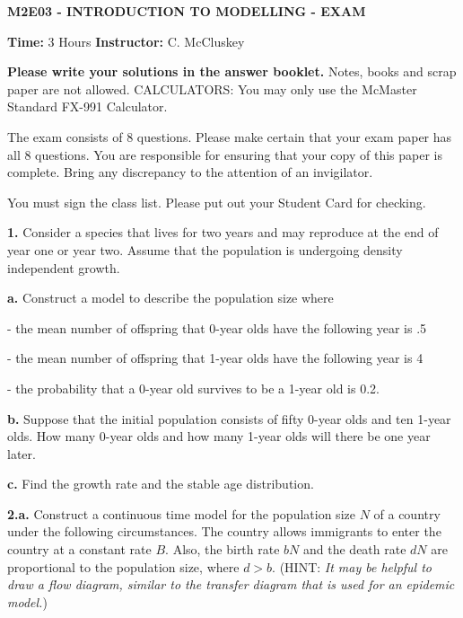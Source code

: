 \documentclass[reqno,12pt]{amsart}
\begin{document}
\begin{center}
{\bf M2E03 - INTRODUCTION TO MODELLING - EXAM}
\end{center}

\vspace{.5cm}
\noindent
{\bf Time:} \hspace{.5cm} 3 Hours
\hspace{7cm}
{\bf Instructor:} \hspace{.5cm} C. McCluskey


\vspace{.5cm}
\noindent
{\bf Please write your solutions in the answer booklet.}
Notes, books and scrap paper are not allowed.
CALCULATORS:  You may only use the McMaster Standard FX-991 Calculator.

\vspace{.5cm}
\noindent
The exam consists of 8 questions.  Please make certain that your exam
paper has all 8 questions.  You are responsible for ensuring that your
copy of this paper is complete.  Bring any discrepancy to the attention
of an invigilator.

\vspace{.5cm}
\noindent
You must sign the class list.
Please put out your Student Card for checking.




\vspace{2cm}


\noindent
{\bf 1.}  Consider a species that lives for two years and may reproduce
at the end of year one or year two.  Assume that the population is
undergoing density independent growth.

\noindent
{\bf a.} Construct a model to describe the population size where

- the mean number of offspring that 0-year olds have the following
year is .5 

- the mean number of offspring that 1-year olds have the following
year is 4

- the probability that a 0-year old survives to be a 1-year old
is 0.2.

\noindent
{\bf b.}  Suppose that the initial population consists of fifty 0-year
olds and ten 1-year olds.  How many 0-year olds and how many
1-year olds will there be one year later.

\noindent
{\bf c.}  Find the growth rate and the stable age distribution.

\vspace{3cm}

\noindent
{\bf 2.a.}  Construct a continuous time model for the population size
$N$ of a country under the following circumstances.  The country
allows immigrants to enter the country at a constant rate $B$.  Also,
the birth rate $bN$ and the death rate $dN$ are proportional to the
population size, where $d>b$.  (HINT: {\it It may be helpful to draw
a flow diagram, similar to the transfer diagram that is used for an
epidemic model.})
\end{document}
